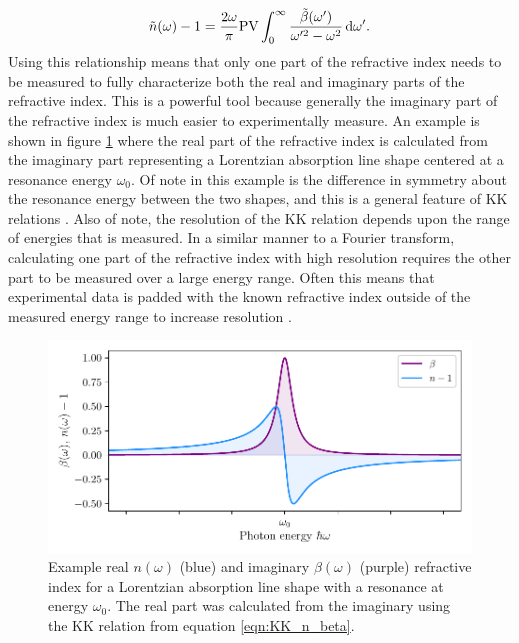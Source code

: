 \begin{equation}
	\label{eqn:KK_n_beta}
	\tilde{n}(\omega) - 1 = \frac{2\omega}{\pi}\mathrm{PV}\int_{0}^{\infty} \frac{\tilde{\beta}(\omega')}{\omega'^2 - \omega^2} \mathop{}\!\mathrm{d} \omega'.
\end{equation}
Using this relationship means that only one part of the refractive index needs to be measured to fully characterize both the real and imaginary parts of the refractive index.  This is a powerful tool because generally the imaginary part of the refractive index is much easier to experimentally measure.  An example is shown in figure \ref{fig:KK_example} where the real part of the refractive index is calculated from the imaginary part representing a Lorentzian absorption line shape centered at a resonance energy $\omega_0$.  Of note in this example is the difference in symmetry about the resonance energy between the two shapes, and this is a general feature of KK relations \cite{lucariniKramersKronigRelationsOptical2005}.  Also of note, the resolution of the KK relation depends upon the range of energies that is measured.  In a similar manner to a Fourier transform, calculating one part of the refractive index with high resolution requires the other part to be measured over a large energy range.  Often this means that experimental data is padded with the known refractive index outside of the measured energy range to increase resolution \cite{kaplanRetrievalComplexvaluedRefractive2019}.

\begin{figure}
	\centering
	\includegraphics[width=1.0\textwidth]{figures/CATS/KK_example.pdf}
	\caption[Example real and imaginary refractive index calculated using KK relations]{Example real $n(\omega)$ (blue) and imaginary $\beta(\omega)$ (purple) refractive index for a Lorentzian absorption line shape with a resonance at energy $\omega_0$.  The real part was calculated from the imaginary using the KK relation from equation \ref{eqn:KK_n_beta}.}
	\label{fig:KK_example}
\end{figure}



